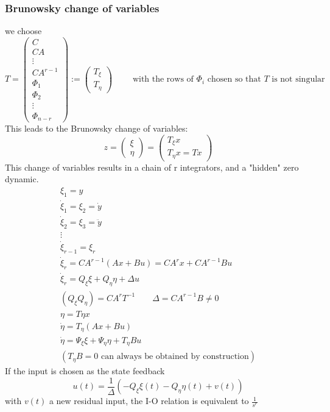 \documentclass{book}
\theoremstyle{definition}
\theoremstyle{remark}
\theoremstyle{remark}
\begin{document}
\subsubsection{Brunowsky change of variables}
we choose
\[
T=\begin{pmatrix}
    C\\CA\\ \vdots \\CA^{r-1}\\ \Phi_1 \\ \Phi_2 \\ \vdots \\ \Phi_{n-r}
\end{pmatrix} := \begin{pmatrix}
    T_{\xi} \\ T_{\eta}
\end{pmatrix} \qquad \text{ with the rows of } \Phi_i \text{ chosen so that } T \text{ is not singular}
\]
This leads to the Brunowsky change of variables:
\[
z=\begin{pmatrix}
    \xi \\ \eta
\end{pmatrix} = \begin{pmatrix}
    T_{\xi}x \\ T_{\eta}x = Tx
\end{pmatrix}
\]
This change of variables results in a chain of r integrators, and a "hidden" zero dynamic.
\begin{gather*}
    \xi_1=y \\
    \dot{\xi}_1 = \xi_2 = \dot{y}\\
    \dot{\xi}_2=\xi_3 = \ddot{y}\\
    \vdots \\
    \dot{\xi}_{r-1} = \xi_r\\
    \dot{\xi}_r = CA^{r-1}(Ax+Bu)=CA^rx+CA^{r-1}Bu\\
    \dot{\xi}_r = Q_{\xi} \xi + Q_{\eta}\eta + \Delta u\\
    (Q_{\xi} Q_{\eta}) = CA^rT^{-1} \qquad \Delta = CA^{r-1}B \neq 0
    \\
    \eta = T{\eta} x\\
    \dot{\eta} =T_{\eta}(Ax+Bu)\\
    \dot{\eta} = \Psi_{\xi} \xi + \Psi_{\eta} \eta + T_{\eta}Bu \\ (T_{\eta}B=0 \text{ can always be obtained by construction})
\end{gather*}
If the input is chosen as the state feedback
\[
u(t)=\frac{1}{\Delta}(-Q_{\xi}\xi(t)-Q_{\eta}\eta(t)+v(t))
\]
with $v(t)$ a new residual input, the I-O relation is equivalent to $\frac{1}{s^r}$
\end{document}

